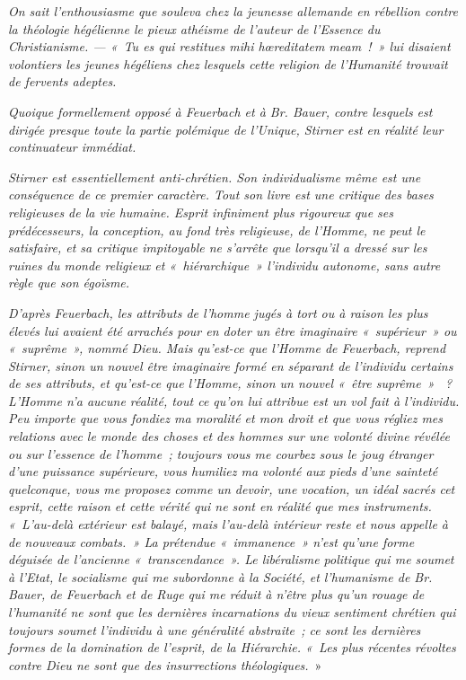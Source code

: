 \documentclass[french,twoside]{book} %
\begin{document}
\emph{On sait l’enthousiasme que souleva chez la jeunesse allemande en rébellion contre la théologie hégélienne le pieux athéisme de l’auteur de l’\emph{Essence du Christianisme}. — « Tu es qui restitues mihi hœreditatem meam ! » lui disaient volontiers les jeunes hégéliens chez lesquels cette religion de l’Humanité trouvait de fervents adeptes.}\par
\emph{Quoique formellement opposé à Feuerbach et à Br. Bauer, contre lesquels est dirigée presque toute la partie polémique de l’\emph{Unique}, Stirner est en réalité leur continuateur immédiat.}\par
\emph{Stirner est essentiellement anti-chrétien. Son individualisme même est une conséquence de ce premier caractère. Tout son livre est une critique des bases religieuses de la vie humaine. Esprit infiniment plus rigoureux que ses prédécesseurs, la conception, au fond très religieuse, de l’Homme, ne peut le satisfaire, et sa critique impitoyable ne s’arrête que lorsqu’il a dressé sur les ruines du monde religieux et « hiérarchique » l’individu autonome, sans autre règle que son égoïsme.}\par
\emph{D’après Feuerbach, les attributs de l’homme jugés à tort ou à raison les plus élevés lui avaient été arrachés pour en doter un être imaginaire « supérieur » ou « suprême », nommé Dieu. Mais qu’est-ce que l’Homme de Feuerbach, reprend Stirner, sinon un nouvel être imaginaire formé en séparant de l’individu certains de ses attributs, et qu’est-ce que l’Homme, sinon un nouvel « être suprême »  ? L’Homme n’a aucune réalité, tout ce qu’on lui attribue est un vol fait à l’individu. Peu importe  que vous fondiez ma moralité et mon droit et que vous régliez mes relations avec le monde des choses et des hommes sur une volonté divine révélée ou sur l’essence de l’homme ; toujours vous me courbez sous le joug \emph{étranger} d’une puissance supérieure, vous humiliez ma volonté aux pieds d’une sainteté quelconque, vous me proposez comme un devoir, une vocation, un idéal sacrés cet esprit, cette raison et cette vérité qui ne sont en réalité que mes instruments. « L’au-delà extérieur est balayé, mais l’au-delà intérieur reste et nous appelle à de nouveaux combats. » La prétendue « immanence » n’est qu’une forme déguisée de l’ancienne « transcendance ». Le libéralisme politique qui me soumet à l’Etat, le socialisme qui me subordonne à la Société, et l’humanisme de Br. Bauer, de Feuerbach et de Ruge qui me réduit à n’être plus qu’un rouage de l’humanité ne sont que les dernières incarnations du vieux sentiment chrétien qui toujours soumet l’individu à une généralité abstraite ; ce sont les dernières formes de la domination de l’esprit, de la Hiérarchie. « Les plus récentes révoltes contre Dieu ne sont que des insurrections théologiques.} »\par
\end{document}
